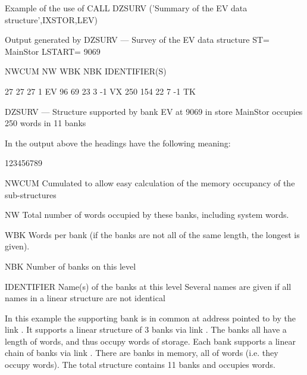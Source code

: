 \newpage
\begin{XMPt}{Example of the use of }
      CALL DZSURV ('Summary of the EV data structure',IXSTOR,LEV)
\end{XMPt}
\begin{XMPt}{Output generated by }
DZSURV --- Survey of the EV data structure  ST= MainStor  LSTART=     9069
                                                                                                                                 
  NWCUM     NW   WBK  NBK    IDENTIFIER(S)                                                                                       
                                                                                                                                 
     27     27    27    1     EV                                                                                                 
     96     69    23    3       -1 VX                                                                                            
    250    154    22    7            -1 TK                                                                                       

DZSURV --- Structure supported by bank EV at 9069 in store MainStor occupies 250 words in 11 banks        
\end{XMPt}

In the output above the headings have the following meaning:
\begin{DLtt}{123456789}
\item[NWCUM]Cumulated  to allow easy calculation of
the memory occupancy of the sub-structures
\item[NW]Total number of words occupied by these  banks,
including system words.
\item[WBK]Words per bank (if the  banks are not all
of the same length, the longest is given).
\item[NBK]Number of banks on this level
\item[IDENTIFIER]Name(s) of the banks at this level
\newline Several names are given if all names
in a linear structure are not identical
\end{DLtt}

In this example
the supporting bank  is in common \Lit{//} at address
 pointed to by the link .
It supports a linear structure of 3  banks via link .
The  banks all
have a length of  words, and thus occupy  words of storage.
Each  bank supports a linear chain of
 banks via link .
There are   banks in memory, all of  words
(i.e. they occupy  words).
The total structure contains 11 banks and occupies  words.

